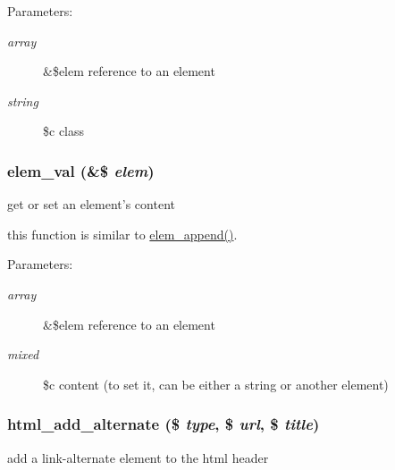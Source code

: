 \begin{Desc}
\item[Parameters:]
\begin{description}
\item[{\em array}]\&\$elem reference to an element \item[{\em string}]\$c class \end{description}
\end{Desc}
\hypertarget{html_8inc_8php_e28d850c3c906c6884462ca89c06f59b}{
\subsubsection[{elem\_\-val}]{\setlength{\rightskip}{0pt plus 5cm}elem\_\-val (\&\$ {\em elem})}}
\label{html_8inc_8php_e28d850c3c906c6884462ca89c06f59b}


get or set an element's content

this function is similar to \hyperlink{html_8inc_8php_ea37c451f5d55e2efbb2656e340c1dae}{elem\_\-append()}. \begin{Desc}
\item[Parameters:]
\begin{description}
\item[{\em array}]\&\$elem reference to an element \item[{\em mixed}]\$c content (to set it, can be either a string or another element) \end{description}
\end{Desc}
\hypertarget{html_8inc_8php_e013e8f0bdd681184ee1873a1964c454}{
\subsubsection[{html\_\-add\_\-alternate}]{\setlength{\rightskip}{0pt plus 5cm}html\_\-add\_\-alternate (\$ {\em type}, \/  \$ {\em url}, \/  \$ {\em title})}}
\label{html_8inc_8php_e013e8f0bdd681184ee1873a1964c454}


add a link-alternate element to the html header

